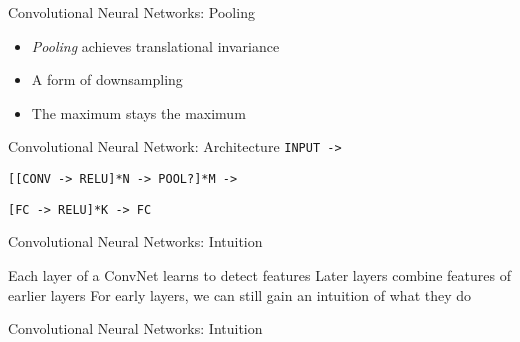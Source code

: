 \begin{frame}[fragile]{Convolutional Neural Networks: Pooling}
  \begin{itemize}
    \item<1-> \emph{Pooling} achieves translational invariance
    \item<2-> A form of downsampling
    \item<3-> The maximum stays the maximum
  \end{itemize}
  \vspace{0.5cm}

  \begin{center}
\end{center}
\end{frame}

\begin{slide}{Convolutional Neural Network: Architecture}
  \texttt{INPUT ->}

  \texttt{[[CONV -> RELU]*N -> POOL?]*M ->}

  \texttt{[FC -> RELU]*K -> FC}

  \begin{flushleft}\cite{karpathy1}\end{flushleft}
\end{slide}

\begin{slide}{Convolutional Neural Networks: Intuition}
  \begin{itemize}
    \pitem Each layer of a ConvNet learns to detect features
    \pitem Later layers combine features of earlier layers
    \pitem For early layers, we can still gain an intuition of what they do
  \end{itemize}
\end{slide}

\begin{slide}{Convolutional Neural Networks: Intuition}

\end{slide}

